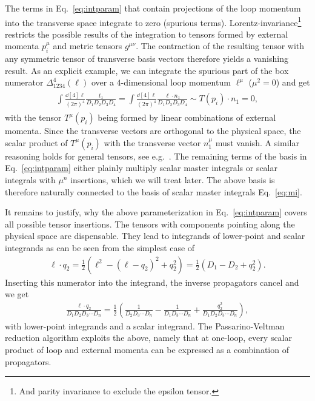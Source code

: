 The terms in Eq.~\eqref{eq:intparam} that contain
projections of the loop momentum into the transverse space integrate
to zero (spurious terms). Lorentz-invariance\footnote{And parity invariance to
  exclude the epsilon tensor.} restricts the possible results of the
integration to tensors formed by external momenta $p_i^\mu$ and metric tensors
$g^{\mu\nu}$. The contraction of the resulting tensor with any
symmetric tensor of transverse basis vectors therefore yields a vanishing result. As an explicit example, we can integrate the
spurious part of the box numerator $\Delta^4_{1234}(\ell)$ over a $4$-dimensional loop momentum $\ell^\mu$ ($\mu^2=0$) and get
\begin{align}
\begin{split}
  \int\frac{\dd[4]{\ell}}{(2\pi)^{4}}\frac{t_1}{D_1D_2D_3D_4}=\int\frac{\dd[4]{\ell}}{(2\pi)^{4}}\frac{\ell\cdot
    n_1}{D_1D_2D_3D_4}\sim T(p_i)\cdot n_{1}=0,
\end{split}
\end{align}
with the tensor $T^\mu(p_i)$ being formed by linear combinations of external
momenta. Since the transverse vectors are orthogonal to the physical
space, the scalar product of $T^\mu(p_i)$ with the transverse
vector $n_1^\mu$ must vanish. A similar reasoning holds for general
tensors, see e.g.\ \cite{Ita:2011hi}. The remaining terms of the basis
in Eq.~\eqref{eq:intparam} either plainly multiply scalar master
integrals or scalar integrals with $\mu^n$ insertions, which we will treat later. The above basis is therefore naturally
connected to the basis of scalar master integrals Eq.~\eqref{eq:mi}. 

 

It remains to justify, why the above parameterization in
Eq.~\eqref{eq:intparam} covers all possible tensor insertions. The
tensors with components pointing along the physical space are
dispensable. They lead to integrands of lower-point and scalar
integrands as can be seen from the simplest case of 
\begin{align}
  \ell\cdot q_2 = \frac{1}{2}\left(\ell^2-(\ell-q_2)^2+q_2^2\right)=\frac{1}{2}\left(D_1-D_2+q_2^2\right).
\end{align}
Inserting this numerator into the integrand, the inverse propagators
cancel and we get
\begin{align}\label{eq:physdir}
  \frac{\ell\cdot q_2}{D_1D_2D_3\cdots D_n} = \frac{1}{2}\left(\frac{1}{D_2D_3\cdots D_n}-\frac{1}{D_1D_3\cdots D_n}+\frac{q_2^2}{D_1D_2D_3\cdots D_n}\right),
\end{align}
with lower-point integrands and a scalar integrand. The
Passarino-Veltman reduction algorithm \cite{Passarino:1978jh} exploits
the above, namely that at one-loop, every scalar product of loop and
external momenta can be expressed as a combination of propagators. 

